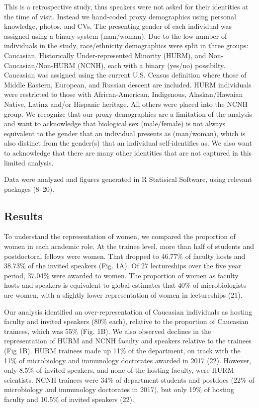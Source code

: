 \documentclass[10pt,]{article}
\begin{document}
This is a retrospective study, thus speakers were not asked for their
identities at the time of visit. Instead we hand-coded proxy
demographics using personal knowledge, photos, and CVs. The presenting
gender of each individual was assigned using a binary system
(man/woman). Due to the low number of individuals in the study,
race/ethnicity demographics were split in three groups: Caucasian,
Historically Under-represented Minority (HURM), and
Non-Caucasian/Non-HURM (NCNH), each with a binary (yes/no) possibilty.
Caucasian was assigned using the current U.S. Census definition where
those of Middle Eastern, European, and Russian descent are included.
HURM individuals were restricted to those with African-American,
Indigenous, Alaskan/Hawaian Native, Latinx and/or Hispanic heritage. All
others were placed into the NCNH group. We recognize that our proxy
demographics are a limitation of the analysis and want to acknowledge
that biological sex (male/female) is not always equivalent to the gender
that an individual presents as (man/woman), which is also distinct from
the gender(s) that an individual self-identifies as. We also want to
acknowledge that there are many other identities that are not captured
in this limited analysis.

Data were analyzed and figures generated in R Statisical Software, using
relevant packages (8--20).

\subsection{Results}\label{results}

To understand the representation of women, we compared the proportion of
women in each academic role. At the trainee level, more than half of
students and postdoctoral fellows were women. That dropped to 46.77\% of
faculty hosts and 38.73\% of the invited speakers (Fig. 1A). Of 27
lectureships over the five year period, 37.04\% were awarded to women.
The proportion of women as faculty hosts and speakers is equivalent to
global estimates that 40\% of microbiologists are women, with a slightly
lower representation of women in lectureships (21).

Our analysis identified an over-representation of Caucasian individuals
as hosting faculty and invited speakers (80\% each), relative to the
proportion of Caucasian trainees, which was 55\% (Fig. 1B). We also
observed declines in the representation of HURM and NCNH faculty and
speakers relative to the trainees (Fig 1B). HURM trainees made up 11\%
of the department, on track with the 11\% of microbiology and immunology
doctorates awarded in 2017 (22). However, only 8.5\% of invited
speakers, and none of the hosting faculty, were HURM scientists. NCNH
trainees were 34\% of department students and postdocs (22\% of
microbiology and immunology doctorates in 2017), but only 19\% of
hosting faculty and 10.5\% of invited speakers (22).
\end{document}
